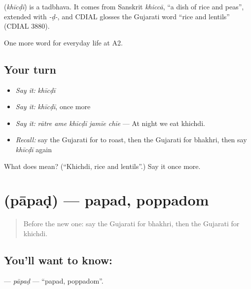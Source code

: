 \begin{cousinweb}
\textbf{} (\emph{khīcḍī}) is a tadbhava. It comes from Sanskrit \emph{khiccā}, \textquotedblleft{}a dish of rice and peas\textquotedblright{}, extended with \emph{-ḍ-}, and CDIAL glosses the Gujarati word \textquotedblleft{}rice and lentils\textquotedblright{} (CDIAL 3880).
\end{cousinweb}

\begin{grammarlens}[title={What you've built}]
One more word for everyday life at A2.
\end{grammarlens}

\subsection*{Your turn}
\begin{itemize}
\raggedright
  \item \emph{Say it:} \emph{khīcḍī}
  \item \emph{Say it:} \emph{khīcḍī}, once more
  \item \emph{Say it:} \emph{rātre ame khīcḍī jamīe chīe} — At night we eat khichdi.
  \item \emph{Recall:} say the Gujarati for to roast, then the Gujarati for bhakhri, then say \emph{khīcḍī} again
\end{itemize}

\begin{tcolorbox}[breakable,colback=teal!4,colframe=teal!35!black,title={Before you move on}]
What does  mean? (\textquotedblleft{}Khichdi, rice and lentils\textquotedblright{}.) Say it once more.
\end{tcolorbox}
\section[\texorpdfstring{\gu{પાપડ} (pāpaḍ)}{પાપડ (pāpaḍ)}]{ (pāpaḍ) — papad, poppadom}

\label{lesson:GU-C169-papad}



\begin{quote}
Before the new one: say the Gujarati for bhakhri, then the Gujarati for khichdi.
\end{quote}

\subsection*{You'll want to know: }
\textbf{} — \emph{pāpaḍ} — \textquotedblleft{}papad, poppadom\textquotedblright{}.

